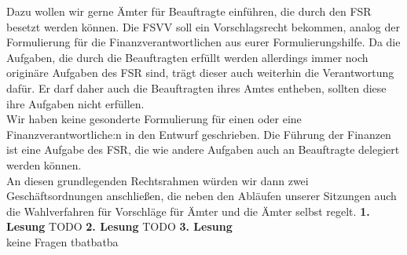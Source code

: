 {        Dazu wollen wir gerne Ämter für Beauftragte einführen, die durch den FSR besetzt werden können. Die FSVV soll ein
        Vorschlagsrecht bekommen, analog der Formulierung für die Finanzverantwortlichen aus eurer Formulierungshilfe.
        Da die Aufgaben, die durch die Beauftragten erfüllt werden allerdings immer noch originäre Aufgaben des FSR sind,
        trägt dieser auch weiterhin die Verantwortung dafür. Er darf daher auch die Beauftragten ihres Amtes entheben,
        sollten diese ihre Aufgaben nicht erfüllen.\\
        Wir haben keine gesonderte Formulierung für einen oder eine Finanzverantwortliche:n in den Entwurf geschrieben.
        Die Führung der Finanzen ist eine Aufgabe des FSR, die wie andere Aufgaben auch an Beauftragte delegiert werden können.\\
        An diesen grundlegenden Rechtsrahmen würden wir dann zwei Geschäftsordnungen anschließen,
        die neben den Abläufen unserer Sitzungen auch die Wahlverfahren für Vorschläge für Ämter und die Ämter selbst regelt.
    }{
        \textbf{1. Lesung}
        TODO
        \textbf{2. Lesung}
        TODO
        \textbf{3. Lesung}\\
        keine Fragen
    }{tba}{tba}{tba}
    
